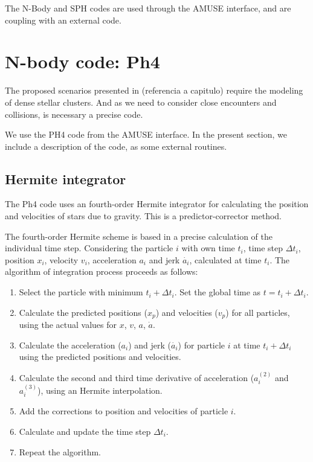 The N-Body and SPH codes are used through the AMUSE interface, and are coupling with an external code.


\section{N-body code: Ph4}

The proposed scenarios presented in (referencia a capitulo) require the modeling of dense stellar clusters. And as we need to consider close encounters and collisions, is necessary a precise code.

We use the PH4 code from the AMUSE interface. In the present section, we include a description of the code, as some external routines.

\subsection{Hermite integrator}

The Ph4 code uses an fourth-order Hermite integrator \cite{makino1992} for calculating the position and velocities of stars due to gravity. This is a predictor-corrector method.

The fourth-order Hermite scheme is based in a precise calculation of the individual time step. Considering the particle $i$ with own time $t_i$, time step $\Delta t_i$, position $x_i$, velocity $v_i$, acceleration $a_i$ and jerk $\dot{a_i}$, calculated at time $t_i$. The algorithm of  integration process proceeds as follows:

\begin{enumerate}
	\item Select the particle with minimum $t_i + \Delta t_i$. Set the global time as $t=t_i + \Delta t_i$.
	\item Calculate the predicted positions ($x_p$) and velocities ($v_p$) for all particles, using the actual values for $x$, $v$, $a$, $\dot{a}$. 
	\item Calculate the acceleration ($a_i$) and jerk ($\dot{a_i}$) for particle $i$ at time $t_i + \Delta t_i$ using the predicted positions and velocities.
	\item Calculate the second and third time derivative of acceleration ($a_i^{(2)}$ and $a_i^{(3)}$), using an Hermite interpolation.
	\item Add the corrections to position and velocities of particle $i$.
	\item Calculate and update the time step $\Delta t_i$.
	\item Repeat the algorithm.
\end{enumerate}


